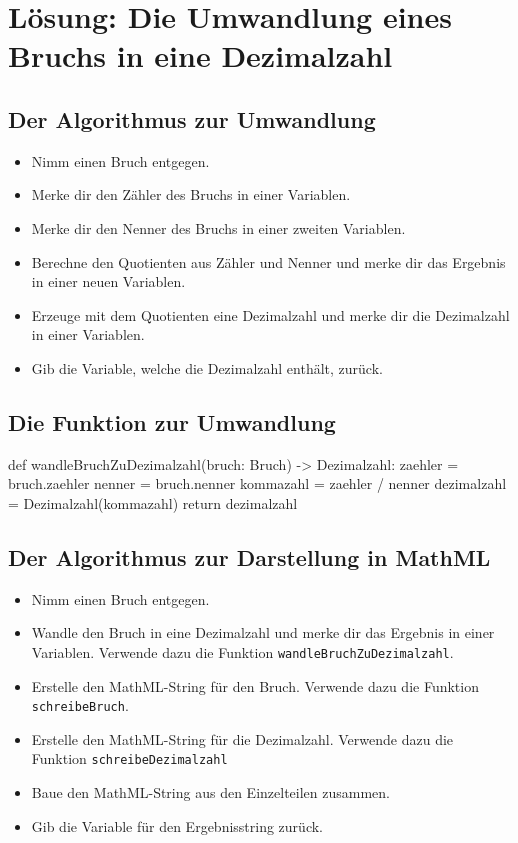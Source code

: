 \section{Lösung: Die Umwandlung eines Bruchs in eine Dezimalzahl}

\subsection*{Der Algorithmus zur Umwandlung}

\begin{itemize}
	\item Nimm einen Bruch entgegen.
	\item Merke dir den Zähler des Bruchs in einer Variablen.
	\item Merke dir den Nenner des Bruchs in einer zweiten Variablen.
	\item Berechne den Quotienten aus Zähler und Nenner und merke dir das Ergebnis in einer neuen Variablen. 
	\item Erzeuge mit dem Quotienten eine Dezimalzahl und merke dir die Dezimalzahl in einer Variablen.
	\item Gib die Variable, welche die Dezimalzahl enthält, zurück.
\end{itemize}

\subsection*{Die Funktion zur Umwandlung}

\begin{codePython}
def wandleBruchZuDezimalzahl(bruch: Bruch) -> Dezimalzahl:
	zaehler = bruch.zaehler
	nenner = bruch.nenner
	kommazahl = zaehler / nenner
	dezimalzahl = Dezimalzahl(kommazahl)
	return dezimalzahl
\end{codePython}

\subsection*{Der Algorithmus zur Darstellung in MathML}

\begin{itemize}
	\item Nimm einen Bruch entgegen.
	\item Wandle den Bruch in eine Dezimalzahl und merke dir das Ergebnis in einer Variablen. Verwende dazu die Funktion \texttt{wandleBruchZuDezimalzahl}.
	\item Erstelle den MathML-String für den Bruch. Verwende dazu die Funktion \texttt{schreibeBruch}.
	\item Erstelle den MathML-String für die Dezimalzahl. Verwende dazu die Funktion \texttt{schreibeDezimalzahl}
	\item Baue den MathML-String aus den Einzelteilen zusammen.
	\item Gib die Variable für den Ergebnisstring zurück.
\end{itemize}

